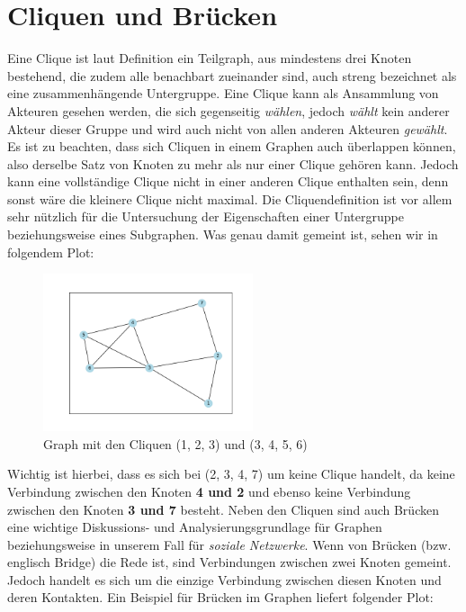\section{Cliquen und Brücken}
Eine Clique ist laut Definition ein Teilgraph, aus mindestens drei Knoten bestehend, die zudem alle benachbart zueinander sind, auch streng bezeichnet als eine zusammenhängende Untergruppe. Eine Clique kann als Ansammlung von Akteuren gesehen werden, die sich gegenseitig \textit{wählen}, jedoch \textit{wählt} kein anderer Akteur dieser Gruppe und wird auch nicht von allen anderen Akteuren \textit{gewählt}. Es ist zu beachten, dass sich Cliquen in einem Graphen auch überlappen können, also derselbe Satz von Knoten zu mehr als nur einer Clique gehören kann. Jedoch kann eine vollständige Clique nicht in einer anderen Clique enthalten sein, denn sonst wäre die kleinere Clique nicht maximal. Die Cliquendefinition ist vor allem sehr nützlich für die Untersuchung der Eigenschaften einer Untergruppe beziehungsweise eines Subgraphen. Was genau damit gemeint ist, sehen wir in folgendem Plot: 
\FloatBarrier
\begin{figure}[htb!]
    \centering
    \includegraphics[width=0.55\textwidth]{Graphics/Clique.png}
    \caption{Graph mit den Cliquen (1, 2, 3) und (3, 4, 5, 6)}
    \label{fig:Clique}
\end{figure}

\newpage
Wichtig ist hierbei, dass es sich bei (2, 3, 4, 7) um keine Clique handelt, da keine Verbindung zwischen den Knoten \textbf{4 und 2} und ebenso keine Verbindung zwischen den Knoten \textbf{3 und 7} besteht.
Neben den Cliquen sind auch Brücken eine wichtige Diskussions- und Analysierungsgrundlage für Graphen beziehungsweise in unserem Fall für \textit{soziale Netzwerke}. Wenn von Brücken (bzw. englisch Bridge) die Rede ist, sind Verbindungen zwischen zwei Knoten gemeint. Jedoch handelt es sich um die einzige Verbindung zwischen diesen Knoten und deren Kontakten. Ein Beispiel für Brücken im Graphen liefert folgender Plot:

